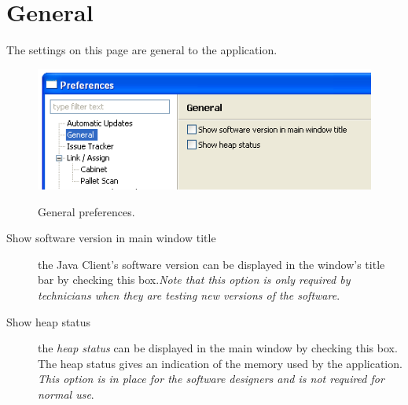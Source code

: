 \section{General}
The settings on this page are general to the application.
\begin{figure}[H]
  \centering
  \scalebox{0.5}
	   { \includegraphics*{screenshots/configuration/prefs_general} }
	   \caption{General preferences.}
	   \label{fig:prefs_general}
\end{figure}
\begin{description}
\item[Show software version in main window title] the Java Client's software
  version can be displayed in the window's title bar by checking this
  box.\textit{Note that this option is only required by technicians when they
    are testing new versions of the software}.
\item[Show heap status] the \emph{heap status} can be displayed in the main
  window by checking this box. The heap status gives an indication of the
  memory used by the application. \textit{This option is in place for the
    software designers and is not required for normal use}.
\end{description}


